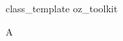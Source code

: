 \begin{zsection}
  \SECTION class\_template \parents oz\_toolkit
\end{zsection}

\begin{class}{A}
\end{class}
